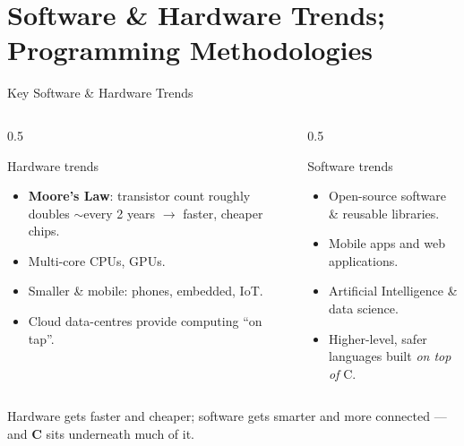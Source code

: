 \documentclass[aspectratio=169]{beamer}
\begin{document}
	\section{Software \& Hardware Trends; Programming Methodologies}
	\begin{frame}{Key Software \& Hardware Trends}
		\begin{columns}[T]
			\begin{column}{0.5\textwidth}
				\begin{block}{Hardware trends}
					\begin{itemize}\small
						\item \textbf{Moore's Law}: transistor count roughly doubles $\sim$every 2 years $\rightarrow$ faster, cheaper chips.
						\item Multi-core CPUs, GPUs.
						\item Smaller \& mobile: phones, embedded, IoT.
						\item Cloud data-centres provide computing ``on tap''.
					\end{itemize}
				\end{block}
			\end{column}
			\begin{column}{0.5\textwidth}
				\begin{block}{Software trends}
					\begin{itemize}\small
						\item Open-source software \& reusable libraries.
						\item Mobile apps and web applications.
						\item Artificial Intelligence \& data science.
						\item Higher-level, safer languages built \emph{on top of} C.
					\end{itemize}
				\end{block}
			\end{column}
		\end{columns}
		\vspace{0.2cm}
		\footnotesize\centering
		Hardware gets faster and cheaper; software gets smarter and more connected --- and \textbf{C} sits underneath much of it.
	\end{frame}
	
\end{document}
